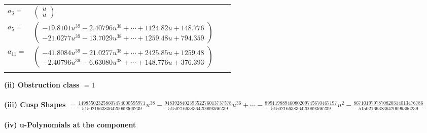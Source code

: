 \documentclass[1p]{elsarticle_modified}
\theoremstyle{definition}
\begin{document}
\begin{tabular}{m{7pt} m{180pt} m{7pt} m{180pt} }
\flushright $a_{3}=$&$\begin{pmatrix}u\\u\end{pmatrix}$ \\
\flushright $a_{5}=$&$\begin{pmatrix}-19.8101 u^{39}-2.40796 u^{38}+\cdots+1124.82 u+148.776\\-21.0277 u^{39}-13.7029 u^{38}+\cdots+1259.48 u+794.359\end{pmatrix}$ \\
\flushright $a_{11}=$&$\begin{pmatrix}-41.8084 u^{39}-21.0277 u^{38}+\cdots+2425.85 u+1259.48\\-2.40796 u^{39}-6.63080 u^{38}+\cdots+148.776 u+376.393\end{pmatrix}$\\&\end{tabular}
\flushleft \textbf{(ii) Obstruction class $= 1$}\\~\\
\flushleft \textbf{(iii) Cusp Shapes $= \frac{149855023258607474000595971}{515021663836420099366239} u^{38}-\frac{948392840239352276013737578}{515021663836420099366239} u^{36}+\cdots-\frac{89911988946080209745670467197}{515021663836420099366239} u^2-\frac{8671019797870820314013476786}{515021663836420099366239}$}\\~\\
\newpage\renewcommand{\arraystretch}{1}
\flushleft \textbf{(iv) u-Polynomials at the component}\newline \\
\end{document}
